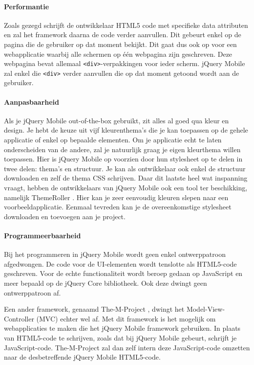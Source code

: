 \paragraph{Performantie}
Zoals gezegd schrijft de ontwikkelaar HTML5 code met specifieke data attributen en zal het framework daarna de code verder aanvullen. Dit gebeurt enkel op de pagina die de gebruiker op dat moment bekijkt. Dit gaat dus ook op voor een webapplicatie waarbij alle schermen op één webpagina zijn geschreven. Deze webpagina bevat allemaal \texttt{<div>}-verpakkingen voor ieder scherm. jQuery Mobile zal enkel die \texttt{<div>} verder aanvullen die op dat moment getoond wordt aan de gebruiker. 

\paragraph{Aanpasbaarheid}
Als je jQuery Mobile out-of-the-box gebruikt, zit alles al goed qua kleur en design. Je hebt de keuze uit vijf kleurenthema's die je kan toepassen op de gehele applicatie of enkel op bepaalde elementen. Om je applicatie echt te laten onderscheiden van de andere, zal je natuurlijk graag je eigen kleurthema willen toepassen. Hier is jQuery Mobile op voorzien door hun stylesheet op te delen in twee delen: thema's en structuur. Je kan als ontwikkelaar ook enkel de structuur downloaden en zelf de thema CSS schrijven. Daar dit laatste heel wat inspanning vraagt, hebben de ontwikkelaars van jQuery Mobile ook een tool ter beschikking,  namelijk ThemeRoller \cite{JQuery2012c}. Hier kan je zeer eenvoudig kleuren slepen naar een voorbeeldapplicatie. Eenmaal tevreden kan je de overeenkomstige stylesheet downloaden en toevoegen aan je project.

\paragraph{Programmeerbaarheid}
Bij het programmeren in jQuery Mobile wordt geen enkel ontwerppatroon afgedwongen. De code voor de UI-elementen wordt tenslotte als HTML5-code geschreven. Voor de echte functionaliteit wordt beroep gedaan op JavaScript en meer bepaald op de jQuery Core bibliotheek. Ook deze dwingt geen ontwerppatroon af.

Een ander framework, genaamd The-M-Project \cite{Panacoda2012}, dwingt het Model-View-Controller (MVC) echter wel af. Met dit framework is het mogelijk om webapplicaties te maken die het jQuery Mobile framework gebruiken. In plaats van HTML5-code te schrijven, zoals dat bij jQuery Mobile gebeurt, schrijft je JavaScript-code. The-M-Project zal dan zelf intern deze JavaScript-code omzetten naar de desbetreffende jQuery Mobile HTML5-code.

